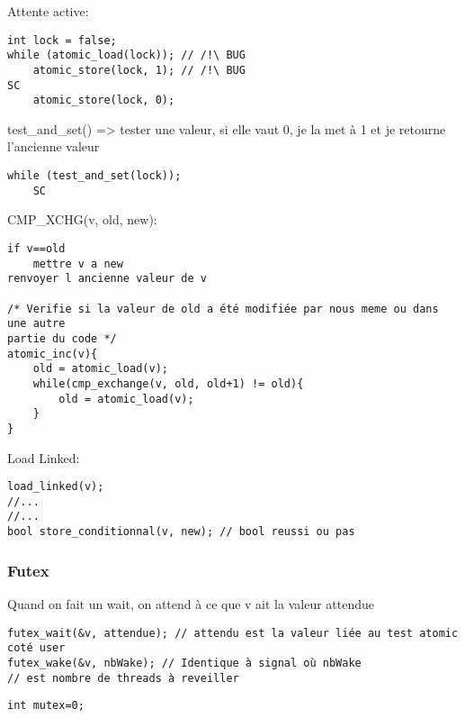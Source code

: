 \documentclass[11pt]{article}
\begin{document}
Attente active:
\begin{verbatim}
int lock = false;
while (atomic_load(lock)); // /!\ BUG
    atomic_store(lock, 1); // /!\ BUG
SC
    atomic_store(lock, 0);
\end{verbatim}

\pagebreak

test\_and\_set() => tester une valeur, si elle vaut 0, je la met à 1 et je retourne l'ancienne valeur
\begin{verbatim}
while (test_and_set(lock));
    SC
\end{verbatim}

CMP\_XCHG(v, old, new):
\begin{verbatim}
if v==old
    mettre v a new
renvoyer l ancienne valeur de v

/* Verifie si la valeur de old a été modifiée par nous meme ou dans une autre 
partie du code */
atomic_inc(v){
    old = atomic_load(v);
    while(cmp_exchange(v, old, old+1) != old){
        old = atomic_load(v);
    }
}
\end{verbatim}

Load Linked:
\begin{verbatim}
load_linked(v);
//...
//...    
bool store_conditionnal(v, new); // bool reussi ou pas

\end{verbatim}

\pagebreak

\subsubsection{Futex}

Quand on fait un wait, on attend à ce que v ait la valeur attendue
\begin{verbatim}
futex_wait(&v, attendue); // attendu est la valeur liée au test atomic coté user
futex_wake(&v, nbWake); // Identique à signal où nbWake 
// est nombre de threads à reveiller
\end{verbatim}

\begin{verbatim}
int mutex=0;

\end{verbatim}
\end{document}
